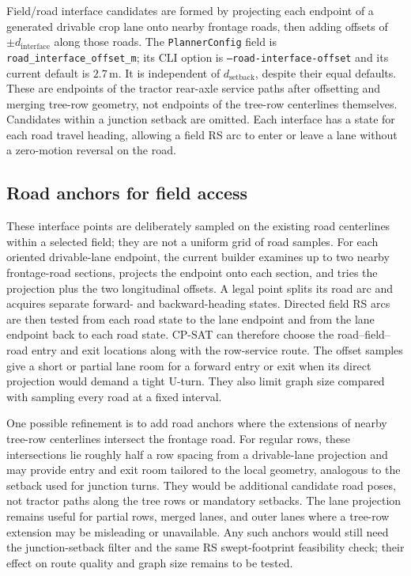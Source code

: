 \documentclass{article}
\begin{document}
Field/road interface candidates are formed by projecting each endpoint of a generated drivable crop lane onto nearby frontage roads, then adding offsets of $\pm d_{\mathrm{interface}}$ along those roads. The \texttt{PlannerConfig} field is \texttt{road\_interface\_offset\_m}; its CLI option is \texttt{--road-interface-offset} and its current default is $2.7\,$m. It is independent of $d_{\mathrm{setback}}$, despite their equal defaults. These are endpoints of the tractor rear-axle service paths after offsetting and merging tree-row geometry, not endpoints of the tree-row centerlines themselves. Candidates within a junction setback are omitted. Each interface has a state for each road travel heading, allowing a field RS arc to enter or leave a lane without a zero-motion reversal on the road.

\subsection{Road anchors for field access}

These interface points are deliberately sampled on the existing road centerlines within a selected field; they are not a uniform grid of road samples. For each oriented drivable-lane endpoint, the current builder examines up to two nearby frontage-road sections, projects the endpoint onto each section, and tries the projection plus the two longitudinal offsets. A legal point splits its road arc and acquires separate forward- and backward-heading states. Directed field RS arcs are then tested from each road state to the lane endpoint and from the lane endpoint back to each road state. CP-SAT can therefore choose the road--field--road entry and exit locations along with the row-service route. The offset samples give a short or partial lane room for a forward entry or exit when its direct projection would demand a tight U-turn. They also limit graph size compared with sampling every road at a fixed interval.

One possible refinement is to add road anchors where the extensions of nearby tree-row centerlines intersect the frontage road. For regular rows, these intersections lie roughly half a row spacing from a drivable-lane projection and may provide entry and exit room tailored to the local geometry, analogous to the setback used for junction turns. They would be additional candidate road poses, not tractor paths along the tree rows or mandatory setbacks. The lane projection remains useful for partial rows, merged lanes, and outer lanes where a tree-row extension may be misleading or unavailable. Any such anchors would still need the junction-setback filter and the same RS swept-footprint feasibility check; their effect on route quality and graph size remains to be tested.
\end{document}
